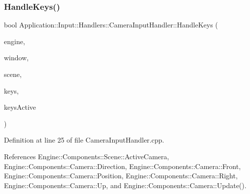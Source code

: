 \subsubsection{\texorpdfstring{Handle\+Keys()}{HandleKeys()}}
{\footnotesize\ttfamily bool Application\+::\+Input\+::\+Handlers\+::\+Camera\+Input\+Handler\+::\+Handle\+Keys (\begin{DoxyParamCaption}\item[{\mbox{\hyperlink{classEngine_1_1BaseEngine}{Engine\+::\+Base\+Engine}} $\ast$}]{engine,  }\item[{\mbox{\hyperlink{classEngine_1_1Components_1_1Window}{Engine\+::\+Components\+::\+Window}} $\ast$}]{window,  }\item[{\mbox{\hyperlink{classEngine_1_1Components_1_1Scene}{Engine\+::\+Components\+::\+Scene}} $\ast$}]{scene,  }\item[{\mbox{\hyperlink{classGeneric_1_1Dictionary}{Generic\+::\+Dictionary}}$<$ short, bool $>$ \&}]{keys,  }\item[{int}]{keys\+Active }\end{DoxyParamCaption})\hspace{0.3cm}{\ttfamily [override]}}



Definition at line 25 of file Camera\+Input\+Handler.\+cpp.



References Engine\+::\+Components\+::\+Scene\+::\+Active\+Camera, Engine\+::\+Components\+::\+Camera\+::\+Direction, Engine\+::\+Components\+::\+Camera\+::\+Front, Engine\+::\+Components\+::\+Camera\+::\+Position, Engine\+::\+Components\+::\+Camera\+::\+Right, Engine\+::\+Components\+::\+Camera\+::\+Up, and Engine\+::\+Components\+::\+Camera\+::\+Update().


